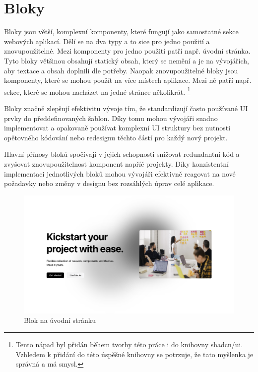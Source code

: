 \clearpage

\section{Bloky}
Bloky jsou větší, komplexní komponenty, které fungují jako samostatné sekce webových aplikací. Dělí se na dva typy a to sice pro jedno použití a znovupoužitelné. Mezi komponenty pro jedno použití patří např. úvodní stránka. Tyto bloky většinou obsahují statický obsah, který se nemění a je na vývojářích, aby textace a obsah doplnili dle potřeby. Naopak znovupoužitelné bloky jsou komponenty, které se mohou použít na více místech aplikace. Mezi ně patří např. sekce, které se mohou nacházet na jedné stránce několikrát. \footnote{Tento nápad byl přidán během tvorby této práce i do knihovny shadcn/ui. Vzhledem k přidání do této úspěšné knihovny se potrzuje, že tato myšlenka je správná a má smysl.}

Bloky značně zlepšují efektivitu vývoje tím, že standardizují často používané UI prvky do předdefinovaných šablon. Díky tomu mohou vývojáři snadno implementovat a opakovaně používat komplexní UI struktury bez nutnosti opětovného kódování nebo redesignu těchto částí pro každý nový projekt.

Hlavní přínosy bloků spočívají v jejich schopnosti snižovat redundantní kód a zvyšovat znovupoužitelnost komponent napříč projekty. Díky konzistentní implementaci jednotlivých bloků mohou vývojáři efektivně reagovat na nové požadavky nebo změny v designu bez rozsáhlých úprav celé aplikace.

\begin{figure}[H]
  \includegraphics[width=\textwidth]{images/hero-block}
  \caption{Blok na úvodní stránku} \label{picture:hero-block}
\end{figure}

